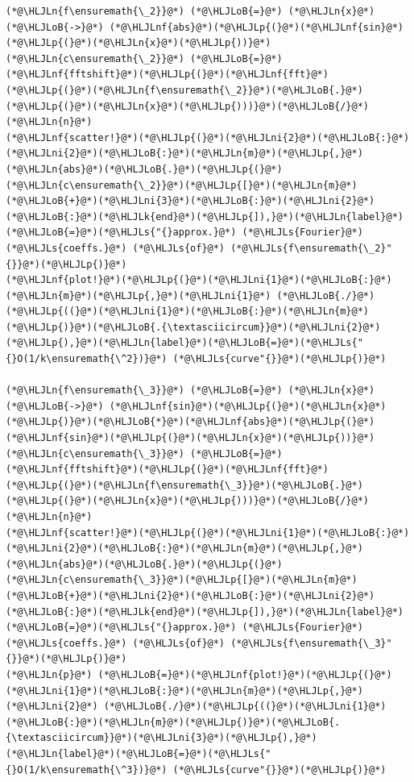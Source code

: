 \documentclass[12pt,landscape]{article}
\newcommand{\HLJLk}[1]{\textcolor[RGB]{148,91,176}{\textbf{#1}}}
\newcommand{\HLJLn}[1]{#1}
\newcommand{\HLJLnf}[1]{\textcolor[RGB]{66,102,213}{#1}}
\newcommand{\HLJLs}[1]{\textcolor[RGB]{201,61,57}{#1}}
\newcommand{\HLJLni}[1]{\textcolor[RGB]{59,151,46}{#1}}
\newcommand{\HLJLoB}[1]{\textcolor[RGB]{102,102,102}{\textbf{#1}}}
\newcommand{\HLJLp}[1]{#1}
\begin{document}
{\begin{lstlisting}
(*@\HLJLn{f\ensuremath{\_2}}@*) (*@\HLJLoB{=}@*) (*@\HLJLn{x}@*) (*@\HLJLoB{->}@*) (*@\HLJLnf{abs}@*)(*@\HLJLp{(}@*)(*@\HLJLnf{sin}@*)(*@\HLJLp{(}@*)(*@\HLJLn{x}@*)(*@\HLJLp{))}@*)
(*@\HLJLn{c\ensuremath{\_2}}@*) (*@\HLJLoB{=}@*) (*@\HLJLnf{fftshift}@*)(*@\HLJLp{(}@*)(*@\HLJLnf{fft}@*)(*@\HLJLp{(}@*)(*@\HLJLn{f\ensuremath{\_2}}@*)(*@\HLJLoB{.}@*)(*@\HLJLp{(}@*)(*@\HLJLn{x}@*)(*@\HLJLp{)))}@*)(*@\HLJLoB{/}@*)(*@\HLJLn{n}@*)
(*@\HLJLnf{scatter!}@*)(*@\HLJLp{(}@*)(*@\HLJLni{2}@*)(*@\HLJLoB{:}@*)(*@\HLJLni{2}@*)(*@\HLJLoB{:}@*)(*@\HLJLn{m}@*)(*@\HLJLp{,}@*)(*@\HLJLn{abs}@*)(*@\HLJLoB{.}@*)(*@\HLJLp{(}@*)(*@\HLJLn{c\ensuremath{\_2}}@*)(*@\HLJLp{[}@*)(*@\HLJLn{m}@*)(*@\HLJLoB{+}@*)(*@\HLJLni{3}@*)(*@\HLJLoB{:}@*)(*@\HLJLni{2}@*)(*@\HLJLoB{:}@*)(*@\HLJLk{end}@*)(*@\HLJLp{]),}@*)(*@\HLJLn{label}@*)(*@\HLJLoB{=}@*)(*@\HLJLs{"{}approx.}@*) (*@\HLJLs{Fourier}@*) (*@\HLJLs{coeffs.}@*) (*@\HLJLs{of}@*) (*@\HLJLs{f\ensuremath{\_2}"{}}@*)(*@\HLJLp{)}@*)
(*@\HLJLnf{plot!}@*)(*@\HLJLp{(}@*)(*@\HLJLni{1}@*)(*@\HLJLoB{:}@*)(*@\HLJLn{m}@*)(*@\HLJLp{,}@*)(*@\HLJLni{1}@*) (*@\HLJLoB{./}@*)(*@\HLJLp{((}@*)(*@\HLJLni{1}@*)(*@\HLJLoB{:}@*)(*@\HLJLn{m}@*)(*@\HLJLp{)}@*)(*@\HLJLoB{.{\textasciicircum}}@*)(*@\HLJLni{2}@*)(*@\HLJLp{),}@*)(*@\HLJLn{label}@*)(*@\HLJLoB{=}@*)(*@\HLJLs{"{}O(1/k\ensuremath{\^2})}@*) (*@\HLJLs{curve"{}}@*)(*@\HLJLp{)}@*)

(*@\HLJLn{f\ensuremath{\_3}}@*) (*@\HLJLoB{=}@*) (*@\HLJLn{x}@*) (*@\HLJLoB{->}@*) (*@\HLJLnf{sin}@*)(*@\HLJLp{(}@*)(*@\HLJLn{x}@*)(*@\HLJLp{)}@*)(*@\HLJLoB{*}@*)(*@\HLJLnf{abs}@*)(*@\HLJLp{(}@*)(*@\HLJLnf{sin}@*)(*@\HLJLp{(}@*)(*@\HLJLn{x}@*)(*@\HLJLp{))}@*)
(*@\HLJLn{c\ensuremath{\_3}}@*) (*@\HLJLoB{=}@*) (*@\HLJLnf{fftshift}@*)(*@\HLJLp{(}@*)(*@\HLJLnf{fft}@*)(*@\HLJLp{(}@*)(*@\HLJLn{f\ensuremath{\_3}}@*)(*@\HLJLoB{.}@*)(*@\HLJLp{(}@*)(*@\HLJLn{x}@*)(*@\HLJLp{)))}@*)(*@\HLJLoB{/}@*)(*@\HLJLn{n}@*)
(*@\HLJLnf{scatter!}@*)(*@\HLJLp{(}@*)(*@\HLJLni{1}@*)(*@\HLJLoB{:}@*)(*@\HLJLni{2}@*)(*@\HLJLoB{:}@*)(*@\HLJLn{m}@*)(*@\HLJLp{,}@*)(*@\HLJLn{abs}@*)(*@\HLJLoB{.}@*)(*@\HLJLp{(}@*)(*@\HLJLn{c\ensuremath{\_3}}@*)(*@\HLJLp{[}@*)(*@\HLJLn{m}@*)(*@\HLJLoB{+}@*)(*@\HLJLni{2}@*)(*@\HLJLoB{:}@*)(*@\HLJLni{2}@*)(*@\HLJLoB{:}@*)(*@\HLJLk{end}@*)(*@\HLJLp{]),}@*)(*@\HLJLn{label}@*)(*@\HLJLoB{=}@*)(*@\HLJLs{"{}approx.}@*) (*@\HLJLs{Fourier}@*) (*@\HLJLs{coeffs.}@*) (*@\HLJLs{of}@*) (*@\HLJLs{f\ensuremath{\_3}"{}}@*)(*@\HLJLp{)}@*)
(*@\HLJLn{p}@*) (*@\HLJLoB{=}@*)(*@\HLJLnf{plot!}@*)(*@\HLJLp{(}@*)(*@\HLJLni{1}@*)(*@\HLJLoB{:}@*)(*@\HLJLn{m}@*)(*@\HLJLp{,}@*)(*@\HLJLni{2}@*) (*@\HLJLoB{./}@*)(*@\HLJLp{((}@*)(*@\HLJLni{1}@*)(*@\HLJLoB{:}@*)(*@\HLJLn{m}@*)(*@\HLJLp{)}@*)(*@\HLJLoB{.{\textasciicircum}}@*)(*@\HLJLni{3}@*)(*@\HLJLp{),}@*)(*@\HLJLn{label}@*)(*@\HLJLoB{=}@*)(*@\HLJLs{"{}O(1/k\ensuremath{\^3})}@*) (*@\HLJLs{curve"{}}@*)(*@\HLJLp{)}@*)
\end{lstlisting}

}
\end{document}

